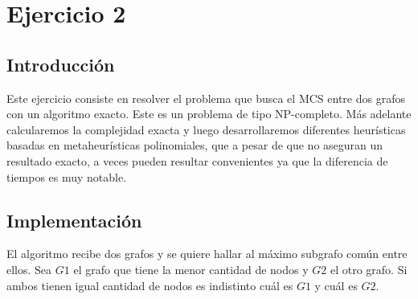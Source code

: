 \section{Ejercicio 2}

\subsection{Introducción}

\noindent Este ejercicio consiste en resolver el problema que busca el MCS entre dos grafos con un algoritmo exacto. Este es un problema de tipo NP-completo. Más adelante calcularemos la complejidad exacta y luego desarrollaremos diferentes heurísticas basadas en metaheurísticas polinomiales, que a pesar de que no aseguran un resultado exacto, a veces pueden resultar convenientes ya que la diferencia de tiempos es muy notable.

\subsection{Implementación}

\noindent El algoritmo recibe dos grafos y se quiere hallar al máximo subgrafo común entre ellos. Sea $G1$ el grafo que tiene la menor cantidad de nodos y $G2$ el otro grafo. Si ambos tienen igual cantidad de nodos es indistinto cuál es $G1$ y cuál es $G2$.\\

